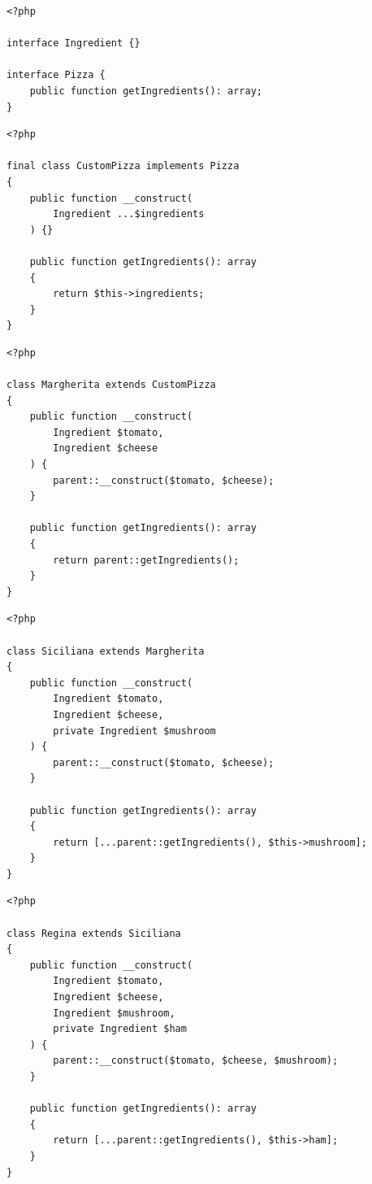 \begin{frame}[fragile,c]
    \begin{lstlisting}
<?php

interface Ingredient {}

interface Pizza {
    public function getIngredients(): array;
}
    \end{lstlisting}
\end{frame}

\begin{frame}[fragile,c]
    \begin{lstlisting}
<?php

final class CustomPizza implements Pizza
{
    public function __construct(
        Ingredient ...$ingredients
    ) {}

    public function getIngredients(): array
    {
        return $this->ingredients;
    }
}
    \end{lstlisting}
\end{frame}

\begin{frame}[fragile,c]
    \begin{lstlisting}
<?php

class Margherita extends CustomPizza
{
    public function __construct(
        Ingredient $tomato,
        Ingredient $cheese
    ) {
        parent::__construct($tomato, $cheese);
    }

    public function getIngredients(): array
    {
        return parent::getIngredients();
    }
}
    \end{lstlisting}
\end{frame}

\begin{frame}[fragile,c]
    \begin{lstlisting}
<?php

class Siciliana extends Margherita
{
    public function __construct(
        Ingredient $tomato,
        Ingredient $cheese,
        private Ingredient $mushroom
    ) {
        parent::__construct($tomato, $cheese);
    }

    public function getIngredients(): array
    {
        return [...parent::getIngredients(), $this->mushroom];
    }
}
    \end{lstlisting}
\end{frame}

\begin{frame}[fragile,c]
    \begin{lstlisting}
<?php

class Regina extends Siciliana
{
    public function __construct(
        Ingredient $tomato,
        Ingredient $cheese,
        Ingredient $mushroom,
        private Ingredient $ham
    ) {
        parent::__construct($tomato, $cheese, $mushroom);
    }

    public function getIngredients(): array
    {
        return [...parent::getIngredients(), $this->ham];
    }
}
    \end{lstlisting}
\end{frame}

